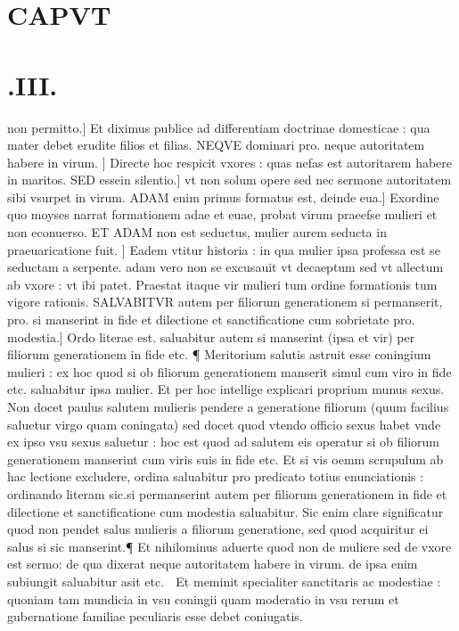 \documentclass{article}
\begin{document}
\begin{pages}
\section*{CAPVT }
\section*{.III. }\pstart non permitto.] Et diximus publice ad differentiam doctrinae domesticae : qua mater debet erudite filios et filias. NEQVE dominari pro. neque autoritatem habere in virum. ] Directe hoc respicit vxores : quas nefas est autoritarem habere in maritos. SED essein silentio.] vt non solum opere sed nec sermone autoritatem sibi vsurpet in virum. ADAM enim primus formatus est, deinde eua.] Exordine quo moyses narrat formationem adae et euae, probat virum praeefse mulieri et non econuerso. ET ADAM non est seductus, mulier aurem seducta in praeuaricatione fuit. ] Eadem vtitur historia : in qua mulier ipsa professa est se seductam a serpente. adam vero non se excusauit vt decaeptum sed vt allectum ab vxore : vt ibi patet. Praestat itaque vir mulieri tum ordine formationis tum vigore rationis. SALVABITVR autem per filiorum generationem si permanserit, pro. si manserint in fide et dilectione et sanctificatione cum sobrietate pro. modestia.] Ordo literae est. saluabitur autem si manserint (ipsa et vir) per filiorum generationem in fide etc. ¶ Meritorium salutis astruit esse coningium mulieri : ex hoc quod si ob filiorum generationem manserit simul cum viro in fide etc. saluabitur ipsa mulier. Et per hoc intellige explicari proprium munus sexus. Non docet paulus salutem mulieris pendere a generatione filiorum (quum facilius saluetur virgo quam coningata) sed docet quod vtendo officio sexus habet vnde ex ipso vsu sexus saluetur : hoc est quod ad salutem eis operatur si ob filiorum generationem manserint cum viris suis in fide etc. Et si vis oemm scrupulum ab hac lectione excludere, ordina saluabitur pro predicato totius enunciationis : ordinando literam sic.si permanserint autem per filiorum generationem in fide et dilectione et sanctificatione cum modestia saluabitur. Sic enim clare significatur quod non pendet salus mulieris a filiorum generatione, sed quod acquiritur ei salus si sic manserint.¶ Et nihilominus aduerte quod non de muliere sed de vxore est sermo: de qua dixerat neque autoritatem habere in virum. de ipsa enim subiungit saluabitur asit etc.  Et meminit specialiter sanctitaris ac modestiae : quoniam tam mundicia in vsu coningii quam moderatio in vsu rerum et gubernatione familiae peculiaris esse debet coniugatis.  \pend

\end{pages}
\end{document}

